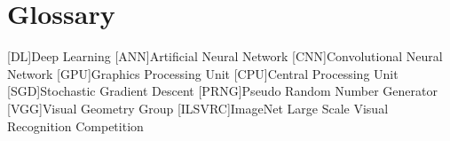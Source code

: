 \chapter{Glossary}

\footnotesize
\SingleSpacing

\begin{multicols}{2}
\begin{acronym}[AAAAAA]

	[DL]{Deep Learning}
	[ANN]{Artificial Neural Network}
	[CNN]{Convolutional Neural Network}
	[GPU]{Graphics Processing Unit}
	[CPU]{Central Processing Unit}
	[SGD]{Stochastic Gradient Descent}
	[PRNG]{Pseudo Random Number Generator}
	[VGG]{Visual Geometry Group}
    [ILSVRC]{ImageNet Large Scale Visual Recognition Competition}

\end{acronym}
\end{multicols}
